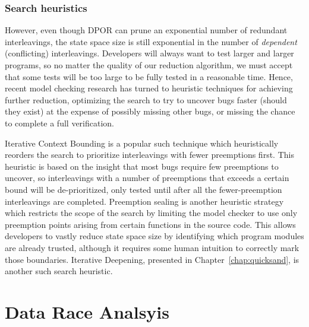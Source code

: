 \subsubsection{Search heuristics}

However, even though DPOR can prune an exponential number of redundant interleavings, the state space size is still exponential in the number of {\em dependent} (conflicting) interleavings.
Developers will always want to test larger and larger programs, so no matter the quality of our reduction algorithm,
we must accept that some tests will be too large to be fully tested in a reasonable time.
Hence, recent model checking research has turned to heuristic techniques for achieving further reduction,
optimizing the search to try to uncover bugs faster (should they exist)
at the expense of possibly missing other bugs,
or missing the chance to complete a full verification.

Iterative Context Bounding \cite{chess-icb} is a popular such technique which heuristically reorders the search to prioritize interleavings with fewer preemptions first.
This heuristic is based on the insight that most bugs require few preemptions to uncover, so interleavings with a number of preemptions that exceeds a certain bound will be de-prioritized, only tested until after all the fewer-preemption interleavings are completed.
Preemption sealing \cite{sealing} is another heuristic strategy which restricts the scope of the search by limiting the model checker to use only preemption points arising from certain functions in the source code.
This allows developers to vastly reduce state space size by identifying which program modules are already trusted,
although it requires some human intuition to correctly mark those boundaries.
Iterative Deepening, presented in Chapter~\ref{chap:quicksand}, is another such search heuristic.


\section{Data Race Analsyis}

